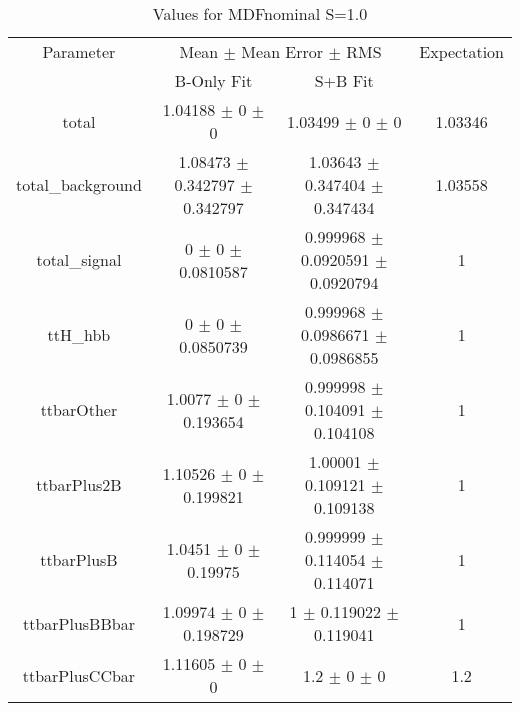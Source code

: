 \begin{table}
\centering
\caption{Values for MDFnominal S=1.0}
\begin{tabular}{cccc}
\toprule
Parameter & \multicolumn{2}{c}{Mean $\pm$ Mean Error $\pm$ RMS} & Expectation\\
 & B-Only Fit & S+B Fit & \\
\midrule
total & \num{1.04188} $\pm$ \num{0} $\pm$ \num{0} & \num{1.03499} $\pm$ \num{0} $\pm$ \num{0} & \num{1.03346}\\
total\_background & \num{1.08473} $\pm$ \num{0.342797} $\pm$ \num{0.342797} & \num{1.03643} $\pm$ \num{0.347404} $\pm$ \num{0.347434} & \num{1.03558}\\
total\_signal & \num{0} $\pm$ \num{0} $\pm$ \num{0.0810587} & \num{0.999968} $\pm$ \num{0.0920591} $\pm$ \num{0.0920794} & \num{1}\\
ttH\_hbb & \num{0} $\pm$ \num{0} $\pm$ \num{0.0850739} & \num{0.999968} $\pm$ \num{0.0986671} $\pm$ \num{0.0986855} & \num{1}\\
ttbarOther & \num{1.0077} $\pm$ \num{0} $\pm$ \num{0.193654} & \num{0.999998} $\pm$ \num{0.104091} $\pm$ \num{0.104108} & \num{1}\\
ttbarPlus2B & \num{1.10526} $\pm$ \num{0} $\pm$ \num{0.199821} & \num{1.00001} $\pm$ \num{0.109121} $\pm$ \num{0.109138} & \num{1}\\
ttbarPlusB & \num{1.0451} $\pm$ \num{0} $\pm$ \num{0.19975} & \num{0.999999} $\pm$ \num{0.114054} $\pm$ \num{0.114071} & \num{1}\\
ttbarPlusBBbar & \num{1.09974} $\pm$ \num{0} $\pm$ \num{0.198729} & \num{1} $\pm$ \num{0.119022} $\pm$ \num{0.119041} & \num{1}\\
ttbarPlusCCbar & \num{1.11605} $\pm$ \num{0} $\pm$ \num{0} & \num{1.2} $\pm$ \num{0} $\pm$ \num{0} & \num{1.2}\\
\bottomrule
\end{tabular}
\end{table}
